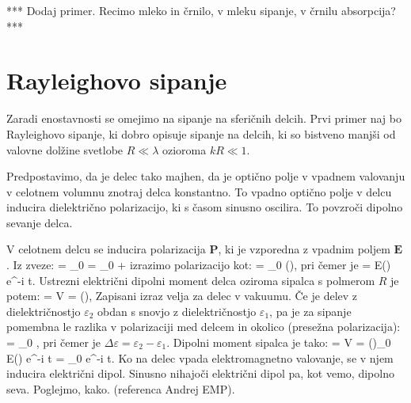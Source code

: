 *** Dodaj primer. Recimo mleko in črnilo, v mleku sipanje, v črnilu absorpcija?***

\section{Rayleighovo sipanje}
Zaradi enostavnosti se omejimo na sipanje na sferičnih delcih. Prvi primer naj bo Rayleighovo 
sipanje, ki dobro opisuje sipanje na delcih, ki so bistveno manjši od valovne dolžine svetlobe
$R \ll \lambda$ ozioroma $kR \ll 1$.

Predpostavimo, da je delec tako majhen, da je optično polje v vpadnem valovanju v celotnem volumnu
znotraj delca konstantno. To vpadno optično polje v delcu inducira dielektrično polarizacijo, ki  
s časom sinusno oscilira. To povzroči dipolno sevanje delca. 

V celotnem delcu se inducira polarizacija $\mathbf{P}$, ki je vzporedna z vpadnim poljem 
$\mathbf{E}$. Iz zveze:
\beq
{} = \varepsilon \varepsilon_0  = \varepsilon_0  + 
\label{eq:07_06}
\eeq
izrazimo polarizacijo kot:
\beq
{} = \varepsilon_0 (),
\label{eq:07_07}
\eeq
pri čemer je 
\beq
{} = E() e^{-i \omega t}.
\label{eq:07_07}
\eeq
Ustrezni električni dipolni moment delca oziroma sipalca s polmerom $R$ je potem:
\beq
{} = V = \left(\right),
\label{eq:07_08}
\eeq
Zapisani izraz velja za delec v vakuumu. Če je delev z dielektričnostjo $\varepsilon_2$ obdan 
s snovjo z dielektričnostjo $\varepsilon_1$, pa je za sipanje pomembna le razlika v polarizaciji 
med delcem in okolico (presežna polarizacija):
\beq
\Delta {} = \varepsilon_0 \Delta \varepsilon {},
\label{eq:07_09}
\eeq
pri čemer je $\Delta \varepsilon = \varepsilon_2 - \varepsilon_1$. Dipolni moment sipalca je tako:
\beq
\Delta {}= \Delta {} V = \Delta \varepsilon 
\left(\right)\varepsilon_0 E() e^{-i \omega t} =
\Delta {}_0 e^{-i \omega t}.
\label{eq:07_10}
\eeq
Ko na delec vpada elektromagnetno valovanje, se v njem inducira električni dipol. Sinusno nihajoči
električni dipol pa, kot vemo, dipolno seva. Poglejmo, kako. (referenca Andrej EMP).

